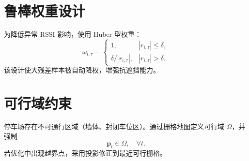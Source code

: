 \section{鲁棒权重设计}
为降低异常 RSSI 影响，使用 Huber 型权重：
\[
\omega_{i,\tau}=
\begin{cases}
1, & |r_{i,\tau}| \le \delta,\\
\delta/|r_{i,\tau}|, & |r_{i,\tau}|>\delta.
\end{cases}
\]
该设计使大残差样本被自动降权，增强抗遮挡能力。

\section{可行域约束}
停车场存在不可通行区域（墙体、封闭车位区）。通过栅格地图定义可行域 $\Omega$，并强制
\[
\bm p_t\in\Omega,\quad \forall t.
\]
若优化中出现越界点，采用投影修正到最近可行栅格。
